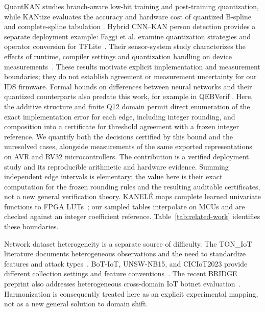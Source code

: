 \documentclass{ieeeaccess}
\begin{document}
QuantKAN studies branch-aware low-bit training and post-training
quantization, while KANtize evaluates the accuracy and hardware cost of
quantized B-spline and complete-spline tabulation
\cite{fuad2025quantkan,errabii2026kantize}.
Hybrid CNN--KAN person detection provides a separate deployment example: Faggi et al. examine quantization strategies and operator conversion for TFLite~\cite{faggi2026quantization}. Their sensor-system study characterizes the effects of runtime, compiler settings and quantization handling on device measurements~\cite{faggi2026sensor}. These results motivate explicit implementation and measurement boundaries; they do not establish agreement or measurement uncertainty for our IDS firmware.
Formal bounds on differences between neural networks and their quantized
counterparts also predate this work, for example in QEBVerif
\cite{zhang2023qebverif}.
Here, the additive structure and finite Q12 domain permit direct enumeration
of the exact implementation error for each edge, including integer rounding,
and composition into a certificate for threshold agreement with a frozen
integer reference. We quantify both the decisions certified by this bound
and the unresolved cases, alongside measurements of the same exported
representations on AVR and RV32 microcontrollers. The contribution is a verified deployment study and its reproducible arithmetic and hardware evidence. Summing independent edge intervals is elementary; the value here is their exact computation for the frozen rounding rules and the resulting auditable certificates, not a new general verification theory. KANEL\'{E} maps complete learned univariate functions to FPGA LUTs~\cite{Hoang2025KANELE}; our sampled tables interpolate on MCUs and are checked against an integer coefficient reference. Table~\ref{tab:related-work} identifies these boundaries.



Network dataset heterogeneity is a separate source of difficulty. The TON\_IoT literature documents heterogeneous observations and the need to standardize features and attack types~\cite{moustafa2021networkton,alsaedi2020ton,booij2022heterogeneity}. BoT-IoT, UNSW-NB15, and CICIoT2023 provide different collection settings and feature conventions~\cite{koroniotis2019botiot,moustafa2015unsw,neto2023ciciot}. The recent BRIDGE preprint also addresses heterogeneous cross-domain IoT botnet evaluation~\cite{bhilwarawala2026bridge}. Harmonization is consequently treated here as an explicit experimental mapping, not as a new general solution to domain shift.
\end{document}
